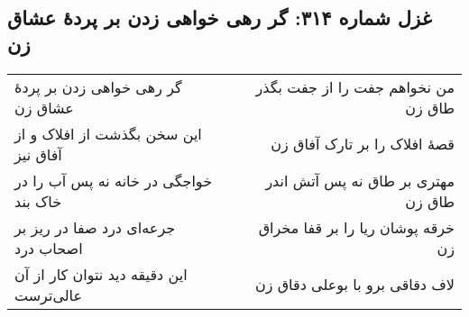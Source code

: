 \begin{center}
\section*{غزل شماره ۳۱۴: گر رهی خواهی زدن بر پردهٔ عشاق زن}
\label{sec:314}
\begin{longtable}{l p{0.5cm} r}
گر رهی خواهی زدن بر پردهٔ عشاق زن
&&
من نخواهم جفت را از جفت بگذر طاق زن
\\
این سخن بگذشت از افلاک و از آفاق نیز
&&
قصهٔ افلاک را بر تارک آفاق زن
\\
خواجگی در خانه نه پس آب را در خاک بند
&&
مهتری بر طاق نه پس آتش اندر طاق زن
\\
جرعه‌ای درد صفا در ریز بر اصحاب درد
&&
خرقه پوشان ریا را بر قفا مخراق زن
\\
این دقیقه دید نتوان کار از آن عالی‌ترست
&&
لاف دقاقی برو با بوعلی دقاق زن
\\
\end{longtable}
\end{center}
